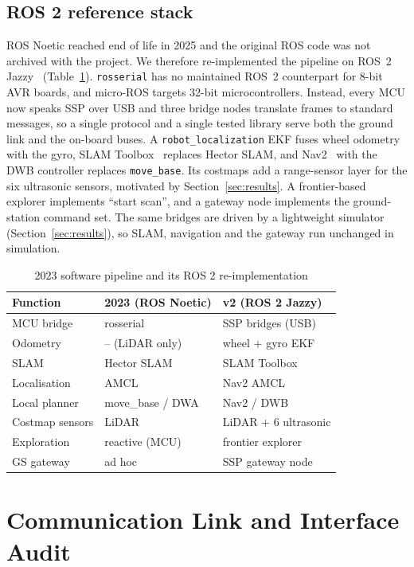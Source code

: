 \documentclass[conference]{IEEEtran}
\begin{document}
\subsection{ROS 2 reference stack}
ROS Noetic reached end of life in 2025 and the original ROS code was not archived with the project. We therefore re-implemented the pipeline on ROS~2 Jazzy~\cite{macenski2022} (Table~\ref{tab:ros}). \texttt{rosserial} has no maintained ROS~2 counterpart for 8-bit AVR boards, and micro-ROS targets 32-bit microcontrollers. Instead, every MCU now speaks SSP over USB and three bridge nodes translate frames to standard messages, so a single protocol and a single tested library serve both the ground link and the on-board buses. A \texttt{robot\_localization} EKF fuses wheel odometry with the gyro, SLAM Toolbox~\cite{macenski2021} replaces Hector SLAM, and Nav2~\cite{macenski2020} with the DWB controller replaces \texttt{move\_base}. Its costmaps add a range-sensor layer for the six ultrasonic sensors, motivated by Section~\ref{sec:results}. A frontier-based explorer implements ``start scan'', and a gateway node implements the ground-station command set. The same bridges are driven by a lightweight simulator (Section~\ref{sec:results}), so SLAM, navigation and the gateway run unchanged in simulation.

\begin{table}[t]
\centering
\caption{2023 software pipeline and its ROS 2 re-implementation}
\label{tab:ros}
\footnotesize
\begin{tabular}{@{}lll@{}}
\toprule
Function & 2023 (ROS Noetic) & v2 (ROS 2 Jazzy) \\
\midrule
MCU bridge & rosserial & SSP bridges (USB) \\
Odometry & -- (LiDAR only) & wheel + gyro EKF \\
SLAM & Hector SLAM & SLAM Toolbox \\
Localisation & AMCL & Nav2 AMCL \\
Local planner & move\_base / DWA & Nav2 / DWB \\
Costmap sensors & LiDAR & LiDAR + 6 ultrasonic \\
Exploration & reactive (MCU) & frontier explorer \\
GS gateway & ad hoc & SSP gateway node \\
\bottomrule
\end{tabular}
\end{table}

\section{Communication Link and Interface Audit}
\label{sec:comm}
\end{document}
